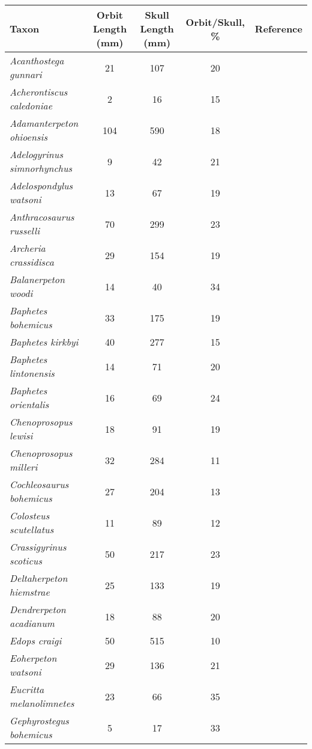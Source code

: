 \begin{tabular}{|L{4.5cm}|c|c|c|L{4.5cm}|}
\hline
\textbf{Taxon}&\textbf{Orbit Length (mm)}&\textbf{Skull Length (mm)}&\textbf{Orbit/Skull, \%}&\textbf{Reference}\\\hline
\textit{Acanthostega gunnari}&21&107&20&\citet{Ahlb08a}\\\hline
\textit{Acherontiscus caledoniae}&2&16&15&\citet{Hook83a}\\\hline
\textit{Adamanterpeton ohioensis}&104&590&18&\citet{Panc77a}\\\hline
\textit{Adelogyrinus simnorhynchus}&9&42&21&\citet{Panc72a}\\\hline
\textit{Adelospondylus watsoni}&13&67&19&\citet{Carr69a}\\\hline
\textit{Anthracosaurus russelli}&70&299&23&\citet{Carr67a}\\\hline
\textit{Archeria crassidisca}&29&154&19&\citet{Sequ03a}\\\hline
\textit{Balanerpeton woodi}&14&40&34&\citet{Clac87a}\\\hline
\textit{Baphetes bohemicus}&33&175&19&\citet{Beau77a}\\\hline
\textit{Baphetes kirkbyi}&40&277&15&\citet{Miln09a}\\\hline
\textit{Baphetes lintonensis}&14&71&20&\citet{Beau77a}\\\hline
\textit{Baphetes orientalis}&16&69&24&\citet{Beau77a}\\\hline
\textit{Chenoprosopus lewisi}&18&91&19&\citet{Ruta06a}\\\hline
\textit{Chenoprosopus milleri}&32&284&11&\citet{Clac12a}\\\hline
\textit{Cochleosaurus bohemicus}&27&204&13&\citet{Brou67b}\\\hline
\textit{Colosteus scutellatus}&11&89&12&\citet{Beau77a}\\\hline
\textit{Crassigyrinus scoticus}&50&217&23&\citet{Warr04a,Warr07a}\\\hline
\textit{Deltaherpeton hiemstrae}&25&133&19&\citet{Bent90a}\\\hline
\textit{Dendrerpeton acadianum}&18&88&20&\citet{Case13a}\\\hline
\textit{Edops craigi}&50&515&10&\citet{Miln94a}\\\hline
\textit{Eoherpeton watsoni}&29&136&21&\citet{Brou67a}\\\hline
\textit{Eucritta melanolimnetes}&23&66&35&\citet{Panc85a}\\\hline
\textit{Gephyrostegus bohemicus}&5&17&33&\citet{Miln98a}\\\hline

\end{tabular}

